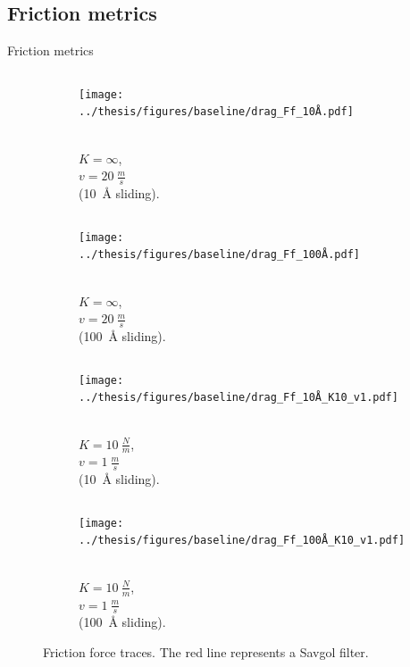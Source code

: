 \documentclass[
	10pt, %
]{beamer}
\begin{document}
\subsection{Friction metrics}
\begin{frame}{Friction metrics}

\begin{figure}[H]
	\centering
	\begin{subfigure}[t]{0.49\textwidth}
		\centering
		\begin{columns}
			\caption{\scriptsize \\ $K = \infty$, \\ $v = \SI{20}{\frac{m}{s}}$ \\ (\SI{10}{Å} sliding).}
			\texttt{[image: ../thesis/figures/baseline/drag\_Ff\_10Å.pdf]}
		\end{columns}
	\end{subfigure}
	\hfill
	\begin{subfigure}[t]{0.49\textwidth}
		\centering
		\begin{columns}
			\column{.7\linewidth}
			\texttt{[image: ../thesis/figures/baseline/drag\_Ff\_100Å.pdf]}
			\column{.3\linewidth}
			\caption{\scriptsize  \\ $K = \infty$, \\ $v = \SI{20}{\frac{m}{s}}$ \\ (\SI{100}{Å} sliding).}
		\end{columns}
	  \end{subfigure}
	\hfill
	\begin{subfigure}[t]{0.49\textwidth}
		\centering
		\begin{columns}
			\column{.3\linewidth}
			\caption{\scriptsize \\$K = \SI{10}{\frac{N}{m}}$, \\ $v = \SI{1}{\frac{m}{s}}$ \\ (\SI{10}{Å} sliding).}
			\texttt{[image: ../thesis/figures/baseline/drag\_Ff\_10Å\_K10\_v1.pdf]}
		\end{columns}
	\end{subfigure}
	\hfill
	\begin{subfigure}[t]{0.49\textwidth}
		\centering
		\begin{columns}
			\column{.7\linewidth}
			\texttt{[image: ../thesis/figures/baseline/drag\_Ff\_100Å\_K10\_v1.pdf]}
			\caption{\scriptsize \\ $K = \SI{10}{\frac{N}{m}}$, \\ $v = \SI{1}{\frac{m}{s}}$ \\ (\SI{100}{Å} sliding).}
		\end{columns}

	\end{subfigure}
	   \caption{Friction force traces. The red line represents a Savgol filter.}
  \end{figure}
\end{frame}
%
%
\end{document}
